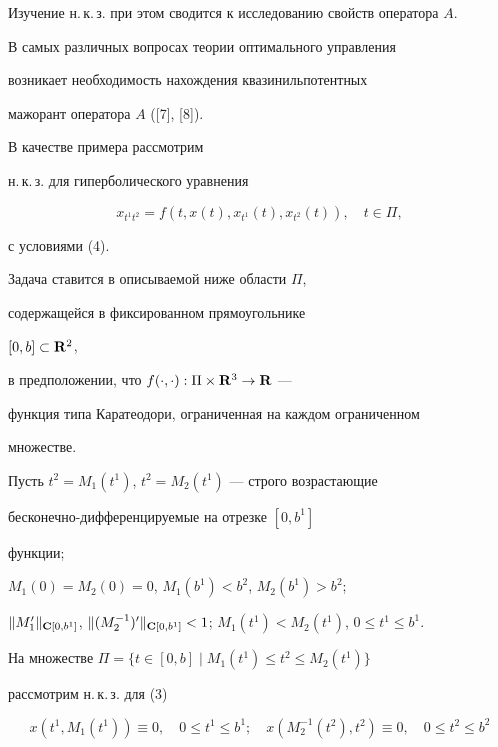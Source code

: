 Изучение н.\,к.\,з. при этом сводится к исследованию свойств оператора $A$.


В самых различных вопросах теории оптимального управления


возникает необходимость нахождения квазинильпотентных


мажорант оператора $A$ ([7], [8]).





В качестве примера рассмотрим 


н.\,к.\,з. для гиперболического уравнения


\begin{equation}


x_{t^1t^2}=f(t,x(t),x_{t^1}(t),x_{t^2}(t)), \quad t\in \Pi,


\end{equation}


с условиями (4).


Задача ставится в описываемой ниже области $\Pi$,


содержащейся в фиксированном прямоугольнике


$[0,b]\subset{\bold R}^2$,


в предположении, что $f(\cdot,\cdot):\Pi\times{\bold R}^3\to{\bold R}$ ---


функция типа Каратеодори, ограниченная на каждом ограниченном


множестве.


Пусть $t^2=M_1(t^1)$, $t^2=M_2(t^1)$ --- строго возрастающие


бесконечно-дифференцируемые на отрезке $[0,b^1]$


функции;


$M_1(0)=M_2(0)=0$, $M_1(b^1)<b^2$, $M_2(b^1)>b^2$;


$\| M'_1\|_{{\bold C}[0,b^1]}$, $\| (M^{-1}_2)'


\|_{{\bold C}[0,b^1]}<1$; $M_1(t^1)< M_2(t^1)$, $0\le t^1\le b^1$.


На множестве $\Pi=\{ t\in [0,b]\mid M_1(t^1)\le t^2 \le M_2(t^1) \}$


рассмотрим н.\,к.\,з. для (3)


\begin{equation}


x(t^1,M_1(t^1))\equiv 0, \quad 0\le t^1 \le b^1; \quad


x(M^{-1}_2(t^2),t^2)\equiv 0,\quad 0\le t^2 \le b^2 


\end{equation}


